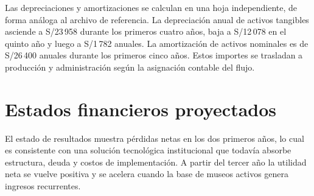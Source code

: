Las depreciaciones y amortizaciones se calculan en una hoja independiente, de forma análoga al archivo de referencia. La depreciación anual de activos tangibles asciende a S/23\,958 durante los primeros cuatro años, baja a S/12\,078 en el quinto año y luego a S/1\,782 anuales. La amortización de activos nominales es de S/26\,400 anuales durante los primeros cinco años. Estos importes se trasladan a producción y administración según la asignación contable del flujo.

\section{Estados financieros proyectados}

El estado de resultados muestra pérdidas netas en los dos primeros años, lo cual es consistente con una solución tecnológica institucional que todavía absorbe estructura, deuda y costos de implementación. A partir del tercer año la utilidad neta se vuelve positiva y se acelera cuando la base de museos activos genera ingresos recurrentes.

